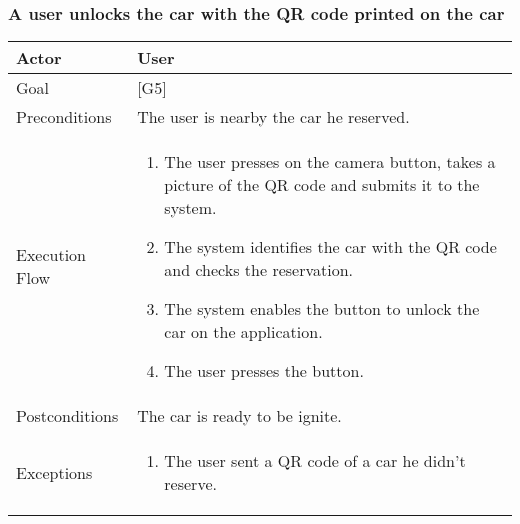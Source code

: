 \documentclass{article}
\begin{document}
	\subsubsection{A user unlocks the car with the QR code printed on the car}
	\begin{tabularx}{\textwidth}{  l  X  }
		\hline
		Actor & User\\
		\hline
		Goal & [G5]\\
		\hline
		Preconditions & The user is nearby the car he reserved.\\
		\hline
		Execution Flow & \begin{enumerate}
			\item{The user presses on the camera button, takes a picture of the QR code and submits it to the system.}
										 \item{The system identifies the car with the QR code and checks the reservation.}
										 \item{The system enables the button to unlock the car on the application.}
										 \item{The user presses the button.}
										\end{enumerate}\\
		\hline
		Postconditions & The car is ready to be ignite.\\
		\hline
		Exceptions & \begin{enumerate}
			\item{The user sent a QR code of a car he didn't reserve.}
	\end{enumerate}\\
		\hline
	\end{tabularx}
\end{document}
